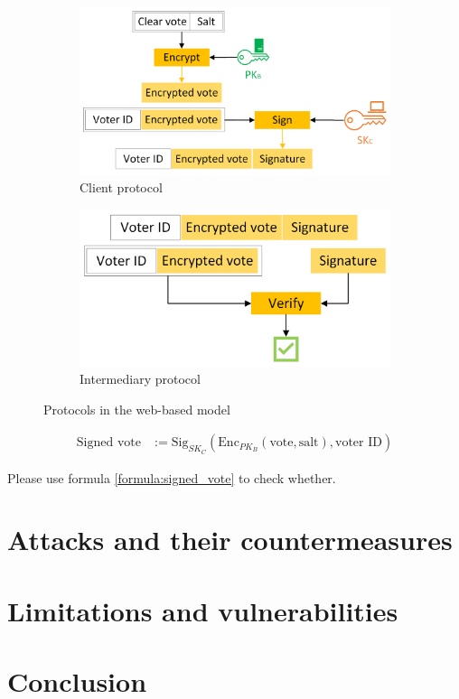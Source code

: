 \documentclass[a4paper,12pt,english]{article}
\begin{document}
\begin{figure}
    \centering
    \begin{subfigure}{0.48\textwidth}
        \includegraphics[width=\textwidth]{Client_Protocol}
        \caption{Client protocol}\label{fig:client}
    \end{subfigure}
    \begin{subfigure}{0.48\textwidth}
        \includegraphics[width=\textwidth]{Intermediary_Protocol}
        \caption{Intermediary protocol}\label{fig:intermediary}
    \end{subfigure}
    \caption{Protocols in the web-based model}
\end{figure}

\begin{align}
    \text{Signed vote} &:= \text{Sig}_{SK_C}(\text{Enc}_{PK_B}(\text{vote}, \text{salt}), \text{voter ID})\label{formula:signed_vote}
\end{align}

Please use formula \ref{formula:signed_vote} to check whether.

\section{Attacks and their countermeasures}\label{sec:attacks}

\section{Limitations and vulnerabilities}\label{sec:limitations}

\section{Conclusion}\label{sec:conclusion}

\newpage

\printbibliography
\end{document}
